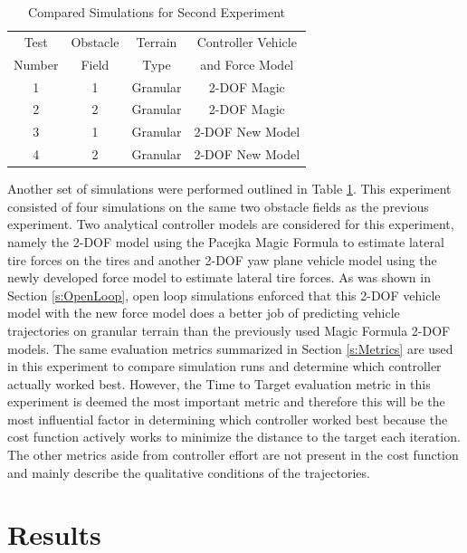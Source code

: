 \documentclass[12pt,onecolumn]{report}
\begin{document}
\begin{table}
\begin{center}
	\begin{tabular}{||c |c | c | c||} 
		\hline
		Test  & Obstacle & Terrain  & Controller Vehicle \\
		Number &  Field & Type & and Force Model\\ [0.5ex] 	
		\hline\hline
		1 & 1 & Granular & 2-DOF Magic\\ 
		\hline
		2 & 2 & Granular & 2-DOF Magic\\
		\hline
		3 & 1 & Granular & 2-DOF New Model\\
		\hline
		4 & 2 & Granular & 2-DOF New Model\\
		\hline
	\end{tabular}
\end{center}
\caption{Compared Simulations for Second Experiment}
\label{t:TestMatrix2}
\end{table}

Another set of simulations were performed outlined in Table \ref{t:TestMatrix2}. This experiment consisted of four simulations on the same two obstacle fields as the previous experiment. Two analytical controller models are considered for this experiment, namely the 2-DOF model using the Pacejka Magic Formula to estimate lateral tire forces on the tires and another 2-DOF yaw plane vehicle model using the newly developed force model to estimate lateral tire forces. As was shown in Section \ref{s:OpenLoop}, open loop simulations enforced that this 2-DOF vehicle model with the new force model does a better job of predicting vehicle trajectories on granular terrain than the previously used Magic Formula 2-DOF models. The same evaluation metrics summarized in Section \ref{s:Metrics} are used in this experiment to compare simulation runs and determine which controller actually worked best. However, the Time to Target evaluation metric in this experiment is deemed the most important metric and therefore this will be the most influential factor in determining which controller worked best because the cost function actively works to minimize the distance to the target each iteration. The other metrics aside from controller effort are not present in the cost function and mainly describe the qualitative conditions of the trajectories. 

\section{Results}\label{s:Results2}
\end{document}
